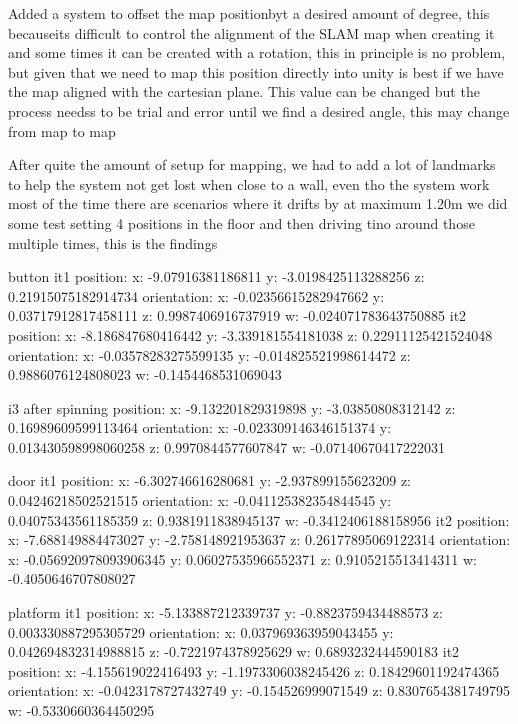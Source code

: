 Added a system to offset the map positionbyt a desired amount of degree, this becauseits difficult to control the alignment of the SLAM map when creating it and some times it can be created with a rotation, this in principle is no problem, but given that we need to map this position directly into unity is best if we have the map aligned with the cartesian plane. This value can be changed but the process needss to be trial and error until we find a desired angle, this may change from map to map

After quite the amount of setup for mapping, we had to add a lot of landmarks to help the system not get lost when close to a wall, even tho the system work most of the time there are scenarios where it drifts by at maximum 1.20m
we did some test setting 4 positions in the floor and then driving tino around those multiple times, this is the findings


        button 
        it1
    position:
      x: -9.07916381186811
      y: -3.0198425113288256
      z: 0.21915075182914734
    orientation:
      x: -0.02356615282947662
      y: 0.03717912817458111
      z: 0.9987406916737919
      w: -0.024071783643750885
      it2
    position:
      x: -8.186847680416442
      y: -3.339181554181038
      z: 0.22911125421524048
    orientation:
      x: -0.03578283275599135
      y: -0.014825521998614472
      z: 0.9886076124808023
      w: -0.1454468531069043

      i3 after spinning
          position:
      x: -9.132201829319898
      y: -3.03850808312142
      z: 0.16989609599113464
    orientation:
      x: -0.023309146346151374
      y: 0.013430598998060258
      z: 0.9970844577607847
      w: -0.07140670417222031


        door
        it1
    position:
      x: -6.302746616280681
      y: -2.937899155623209
      z: 0.04246218502521515
    orientation:
      x: -0.041125382354844545
      y: 0.04075343561185359
      z: 0.9381911838945137
      w: -0.3412406188158956
      it2
    position:
      x: -7.688149884473027
      y: -2.758148921953637
      z: 0.26177895069122314
    orientation:
      x: -0.056920978093906345
      y: 0.06027535966552371
      z: 0.9105215513414311
      w: -0.4050646707808027

      platform
      it1
    position:
      x: -5.133887212339737
      y: -0.8823759434488573
      z: 0.003330887295305729
    orientation:
      x: 0.037969363959043455
      y: 0.042694832314988815
      z: -0.7221974378925629
      w: 0.6893232444590183
    it2
         position:
      x: -4.155619022416493
      y: -1.1973306038245426
      z: 0.18429601192474365
    orientation:
      x: -0.0423178727432749
      y: -0.154526999071549
      z: 0.8307654381749795
      w: -0.5330660364450295

